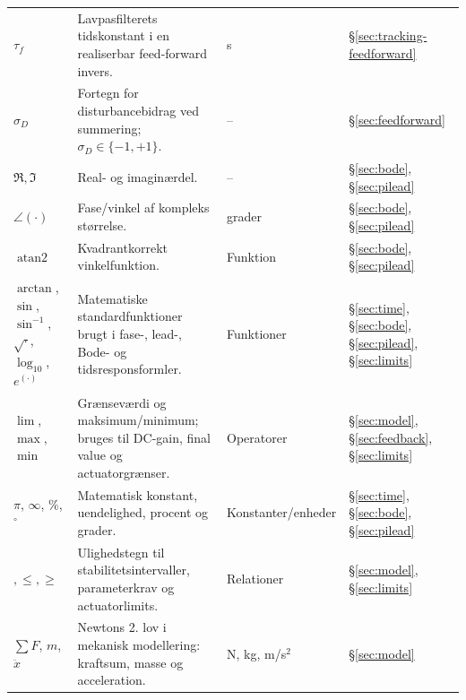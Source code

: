 \begin{longtable}{@{}p{}p{}p{}p{}@{}}
\(\tau_f\) & Lavpasfilterets tidskonstant i en realiserbar feed-forward invers. & s & \S\ref{sec:tracking-feedforward}\\
\(\sigma_D\) & Fortegn for disturbancebidrag ved summering; \(\sigma_D\in\{-1,+1\}\). & -- & \S\ref{sec:feedforward}\\
\(\Re,\Im\) & Real- og imaginærdel. & -- & \S\ref{sec:bode}, \S\ref{sec:pilead}\\
\(\angle(\cdot)\) & Fase/vinkel af kompleks størrelse. & grader & \S\ref{sec:bode}, \S\ref{sec:pilead}\\
\(\operatorname{atan2}\) & Kvadrantkorrekt vinkelfunktion. & Funktion & \S\ref{sec:bode}, \S\ref{sec:pilead}\\
\(\arctan\), \(\sin\), \(\sin^{-1}\), \(\sqrt{\cdot}\), \(\log_{10}\), \(e^{(\cdot)}\) & Matematiske standardfunktioner brugt i fase-, lead-, Bode- og tidsresponsformler. & Funktioner & \S\ref{sec:time}, \S\ref{sec:bode}, \S\ref{sec:pilead}, \S\ref{sec:limits}\\
\(\lim\), \(\max\), \(\min\) & Grænseværdi og maksimum/minimum; bruges til DC-gain, final value og actuatorgrænser. & Operatorer & \S\ref{sec:model}, \S\ref{sec:feedback}, \S\ref{sec:limits}\\
\(\pi\), \(\infty\), \(\%\), \(^\circ\) & Matematisk konstant, uendelighed, procent og grader. & Konstanter/enheder & \S\ref{sec:time}, \S\ref{sec:bode}, \S\ref{sec:pilead}\\
\(<,>,\leq,\geq\) & Ulighedstegn til stabilitetsintervaller, parameterkrav og actuatorlimits. & Relationer & \S\ref{sec:model}, \S\ref{sec:limits}\\
\(\sum F\), \(m\), \(\ddot x\) & Newtons 2. lov i mekanisk modellering: kraftsum, masse og acceleration. & N, kg, m/s\(^2\) & \S\ref{sec:model}\\
\end{longtable}
\normalsize

